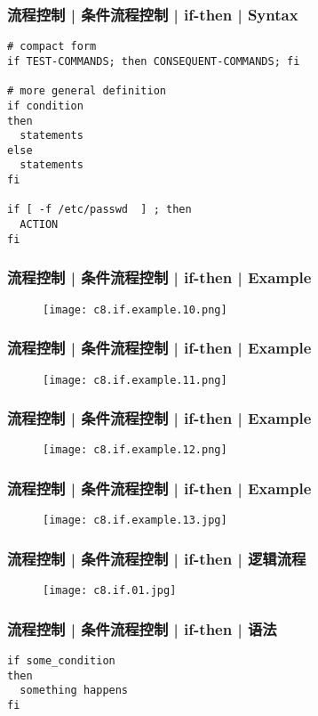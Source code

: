 \begin{frame}[fragile]
  \frametitle{流程控制 | 条件流程控制 | if-then | Syntax}
\begin{lstlisting}
# compact form
if TEST-COMMANDS; then CONSEQUENT-COMMANDS; fi

# more general definition
if condition
then
  statements
else
  statements
fi

if [ -f /etc/passwd  ] ; then
  ACTION
fi
\end{lstlisting}
\end{frame}

\begin{frame}
  \frametitle{流程控制 | 条件流程控制 | if-then | Example}
  \begin{figure}
    \centering
    \texttt{[image: c8.if.example.10.png]}
  \end{figure}
\end{frame}

\begin{frame}
  \frametitle{流程控制 | 条件流程控制 | if-then | Example}
  \begin{figure}
    \centering
    \texttt{[image: c8.if.example.11.png]}
  \end{figure}
\end{frame}

\begin{frame}
  \frametitle{流程控制 | 条件流程控制 | if-then | Example}
  \begin{figure}
    \centering
    \texttt{[image: c8.if.example.12.png]}
  \end{figure}
\end{frame}

\begin{frame}
  \frametitle{流程控制 | 条件流程控制 | if-then | Example}
  \begin{figure}
    \centering
    \texttt{[image: c8.if.example.13.jpg]}
  \end{figure}
\end{frame}

\begin{frame}
  \frametitle{流程控制 | 条件流程控制 | if-then | 逻辑流程}
  \begin{figure}
    \centering
    \texttt{[image: c8.if.01.jpg]}
  \end{figure}
\end{frame}

\begin{frame}[fragile]
  \frametitle{流程控制 | 条件流程控制 | if-then | \alert{语法}}
\begin{lstlisting}
if some_condition
then
  something happens
fi
\end{lstlisting}
\end{frame}

